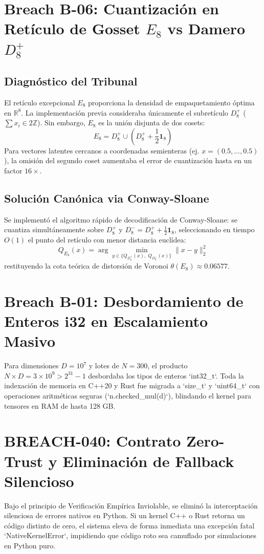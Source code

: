 \section{Breach B-06: Cuantización en Retículo de Gosset $E_8$ vs Damero $D_8^+$}
\subsection{Diagnóstico del Tribunal}
El retículo excepcional $E_8$ proporciona la densidad de empaquetamiento óptima en $\mathbb{R}^8$. La implementación previa consideraba únicamente el subretículo $D_8^+$ ($\sum x_i \in 2\mathbb{Z}$). Sin embargo, $E_8$ es la unión disjunta de dos cosets:
\begin{equation}
E_8 = D_8^+ \cup \left( D_8^+ + \frac{1}{2} \mathbf{1}_8 \right)
\end{equation}
Para vectores latentes cercanos a coordenadas semienteras (ej. $x = (0.5, \dots, 0.5)$), la omisión del segundo coset aumentaba el error de cuantización hasta en un factor $16\times$.

\subsection{Solución Canónica via Conway-Sloane}
Se implementó el algoritmo rápido de decodificación de Conway-Sloane: se cuantiza simultáneamente sobre $D_8^+$ y $D_8^- = D_8^+ + \frac{1}{2}\mathbf{1}_8$, seleccionando en tiempo $O(1)$ el punto del retículo con menor distancia euclídea:
\begin{equation}
Q_{E_8}(x) = \arg\min_{y \in \{Q_{D_8^+}(x), \; Q_{D_8^-}(x)\}} \|x - y\|_2^2
\end{equation}
restituyendo la cota teórica de distorsión de Voronoi $\theta(E_8) \approx 0.06577$.

\section{Breach B-01: Desbordamiento de Enteros i32 en Escalamiento Masivo}
Para dimensiones $D = 10^7$ y lotes de $N = 300$, el producto $N \times D = 3 \times 10^9 > 2^{31}-1$ desbordaba los tipos de enteros `int32\_t`. Toda la indexación de memoria en C++20 y Rust fue migrada a `size_t` y `uint64_t` con operaciones aritméticas seguras (`n.checked_mul(d)`), blindando el kernel para tensores en RAM de hasta 128 GB.

\section{BREACH-040: Contrato Zero-Trust y Eliminación de Fallback Silencioso}
Bajo el principio de Verificación Empírica Inviolable, se eliminó la interceptación silenciosa de errores nativos en Python. Si un kernel C++ o Rust retorna un código distinto de cero, el sistema eleva de forma inmediata una excepción fatal `NativeKernelError`, impidiendo que código roto sea camuflado por simulaciones en Python puro.
